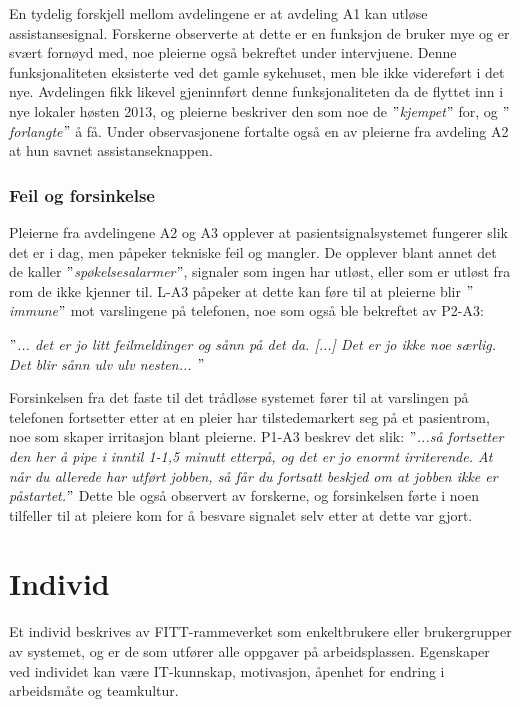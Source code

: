 \noindent
En tydelig forskjell mellom avdelingene er at avdeling A1 kan utløse assistansesignal. Forskerne observerte at dette er en funksjon de bruker mye og er svært fornøyd med, noe pleierne også bekreftet under intervjuene. Denne funksjonaliteten eksisterte ved det gamle sykehuset, men ble ikke videreført i det nye. Avdelingen fikk likevel gjeninnført denne funksjonaliteten da de flyttet inn i nye lokaler høsten 2013, og pleierne beskriver den som noe de \textit{$"$kjempet$"$} for, og \textit{$"$forlangte$"$} å få. Under observasjonene fortalte også en av pleierne fra avdeling A2 at hun savnet assistanseknappen. 

\subsubsection{Feil og forsinkelse}
Pleierne fra avdelingene A2 og A3 opplever at pasientsignalsystemet fungerer slik det er i dag, men påpeker tekniske feil og mangler. De opplever blant annet det de kaller \textit{$"$spøkelsesalarmer$"$}, signaler som ingen har utløst, eller som er utløst fra rom de ikke kjenner til. L-A3 påpeker at dette kan føre til at pleierne blir \textit{$"$immune$"$} mot varslingene på telefonen, noe som også ble bekreftet av P2-A3:

\noindent
\textit{$"$... det er jo litt feilmeldinger og sånn på det da. [...] Det er jo ikke noe særlig. Det blir sånn ulv ulv nesten... $"$}

\noindent 
Forsinkelsen fra det faste til det trådløse systemet fører til at varslingen på telefonen fortsetter etter at en pleier har tilstedemarkert seg på et pasientrom, noe som skaper irritasjon blant pleierne. P1-A3 beskrev det slik: \textit{$"$...så fortsetter den her å pipe i inntil 1-1,5 minutt etterpå, og det er jo enormt irriterende. At når du allerede har utført jobben, så får du fortsatt beskjed om at jobben ikke er påstartet.$"$} Dette ble også observert av forskerne, og forsinkelsen førte i noen tilfeller til at pleiere kom for å besvare signalet selv etter at dette var gjort. 

\section{Individ}
Et individ beskrives av FITT-rammeverket som enkeltbrukere eller brukergrupper av systemet, og er de som utfører alle oppgaver på arbeidsplassen. Egenskaper ved individet kan være IT-kunnskap, motivasjon, åpenhet for endring i arbeidsmåte og teamkultur.

